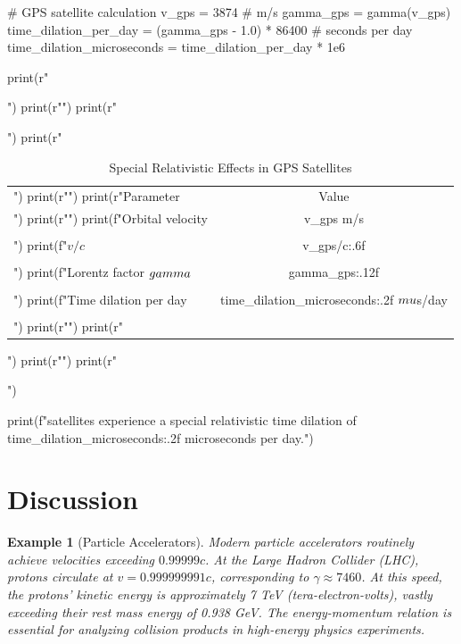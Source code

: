 \documentclass[a4paper, 11pt]{article}
\newtheorem{example}{Example}[section]
\begin{document}
\begin{pycode}
# GPS satellite calculation
v_gps = 3874  # m/s
gamma_gps = gamma(v_gps)
time_dilation_per_day = (gamma_gps - 1.0) * 86400  # seconds per day
time_dilation_microseconds = time_dilation_per_day * 1e6

print(r"\begin{table}[htbp]")
print(r"\centering")
print(r"\caption{Special Relativistic Effects in GPS Satellites}")
print(r"\begin{tabular}{lc}")
print(r"\toprule")
print(r"Parameter & Value \\")
print(r"\midrule")
print(f"Orbital velocity & {v_gps} m/s \\\\")
print(f"$v/c$ & {v_gps/c:.6f} \\\\")
print(f"Lorentz factor $\\gamma$ & {gamma_gps:.12f} \\\\")
print(f"Time dilation per day & {time_dilation_microseconds:.2f} $\\mu$s/day \\\\")
print(r"\bottomrule")
print(r"\end{tabular}")
print(r"\label{tab:gps}")
print(r"\end{table}")

print(f"\nGPS satellites experience a special relativistic time dilation of {time_dilation_microseconds:.2f} microseconds per day.")
\end{pycode}

\section{Discussion}

\begin{example}[Particle Accelerators]
Modern particle accelerators routinely achieve velocities exceeding $0.99999c$. At the
Large Hadron Collider (LHC), protons circulate at $v = 0.999999991c$, corresponding to
$\gamma \approx 7460$. At this speed, the protons' kinetic energy is approximately 7 TeV
(tera-electron-volts), vastly exceeding their rest mass energy of 0.938 GeV. The
energy-momentum relation is essential for analyzing collision products in high-energy physics experiments.
\end{example}
\end{document}
